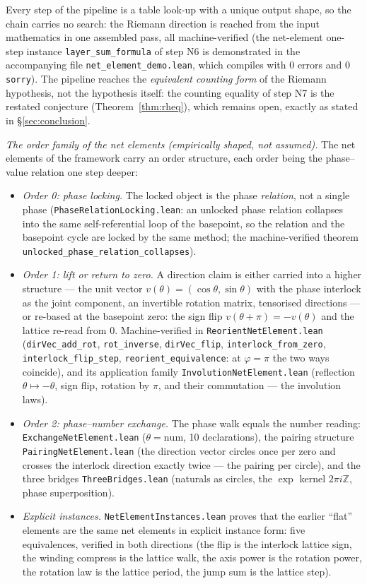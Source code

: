 \documentclass{article}
\begin{document}
Every step of the pipeline is a table look-up with a unique output
shape, so the chain carries no search: the Riemann direction is reached
from the input mathematics in one assembled pass, all machine-verified
(the net-element one-step instance \texttt{layer\_sum\_formula} of step
N6 is demonstrated in the accompanying file
\texttt{net\_element\_demo.lean}, which compiles with 0 errors and 0
\texttt{sorry}). The pipeline reaches the \emph{equivalent counting form}
of the Riemann hypothesis, not the hypothesis itself: the counting
equality of step N7 is the restated conjecture
(Theorem~\ref{thm:rheq}), which remains open, exactly as stated in
\S\ref{sec:conclusion}.

\emph{The order family of the net elements (empirically shaped, not
assumed).} The net elements of the framework carry an order structure,
each order being the phase--value relation one step deeper:
\begin{itemize}
\item \emph{Order 0: phase locking.} The locked object is the phase
  \emph{relation}, not a single phase (\texttt{PhaseRelationLocking.lean}:
  an unlocked phase relation collapses into the same self-referential
  loop of the basepoint, so the relation and the basepoint cycle are
  locked by the same method; the machine-verified theorem
  \texttt{unlocked\_phase\_relation\_collapses}).
\item \emph{Order 1: lift or return to zero.} A direction claim is
  either carried into a higher structure --- the unit vector
  $v(\theta)=(\cos\theta,\sin\theta)$ with the phase interlock as the
  joint component, an invertible rotation matrix, tensorised
  directions --- or re-based at the basepoint zero: the sign flip
  $v(\theta+\pi)=-v(\theta)$ and the lattice re-read from $0$.
  Machine-verified in \texttt{ReorientNetElement.lean}
  (\texttt{dirVec\_add\_rot}, \texttt{rot\_inverse},
  \texttt{dirVec\_flip}, \texttt{interlock\_from\_zero},
  \texttt{interlock\_flip\_step}, \texttt{reorient\_equivalence}: at
  $\varphi=\pi$ the two ways coincide), and its application family
  \texttt{InvolutionNetElement.lean} (reflection
  $\theta\mapsto-\theta$, sign flip, rotation by $\pi$, and their
  commutation --- the involution laws).
\item \emph{Order 2: phase--number exchange.} The phase walk equals
  the number reading: \texttt{ExchangeNetElement.lean}
  ($\theta=\mathrm{num}$, 10 declarations), the pairing structure
  \texttt{PairingNetElement.lean} (the direction vector circles once
  per zero and crosses the interlock direction exactly twice --- the
  pairing per circle), and the three bridges
  \texttt{ThreeBridges.lean} (naturals as circles, the $\exp$ kernel
  $2\pi i\mathbb Z$, phase superposition).
\item \emph{Explicit instances.} \texttt{NetElementInstances.lean}
  proves that the earlier ``flat'' elements are the same net elements
  in explicit instance form: five equivalences, verified in both
  directions (the flip is the interlock lattice sign, the winding
  compress is the lattice walk, the axis power is the rotation power,
  the rotation law is the lattice period, the jump sum is the lattice
  step).
\end{itemize}
\end{document}
